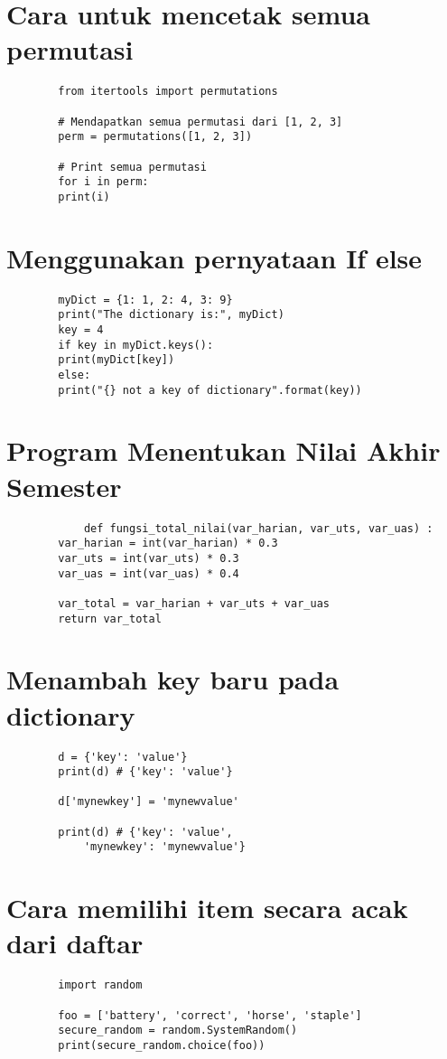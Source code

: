 \documentclass{article}
\begin{document}
	\section {Cara untuk mencetak semua permutasi}
	\begin{lstlisting}
		from itertools import permutations
		
		# Mendapatkan semua permutasi dari [1, 2, 3]
		perm = permutations([1, 2, 3])
		
		# Print semua permutasi
		for i in perm:
		print(i)
	\end{lstlisting}
	
	\section {Menggunakan pernyataan If else}
	\begin{lstlisting}
		myDict = {1: 1, 2: 4, 3: 9}
		print("The dictionary is:", myDict)
		key = 4
		if key in myDict.keys():
		print(myDict[key])
		else:
		print("{} not a key of dictionary".format(key))
	\end{lstlisting}

	\section {Program Menentukan Nilai Akhir Semester}
	\begin{lstlisting}
			def fungsi_total_nilai(var_harian, var_uts, var_uas) :
		var_harian = int(var_harian) * 0.3
		var_uts = int(var_uts) * 0.3
		var_uas = int(var_uas) * 0.4
		
		var_total = var_harian + var_uts + var_uas
		return var_total
	\end{lstlisting}
	
		\section{Menambah key baru pada dictionary}
	\begin{lstlisting}
		d = {'key': 'value'}
		print(d) # {'key': 'value'}
		
		d['mynewkey'] = 'mynewvalue'
		
		print(d) # {'key': 'value',
			'mynewkey': 'mynewvalue'}
	\end{lstlisting}
	
	\section{Cara memilihi item secara acak dari daftar}
	\begin{lstlisting}
		import random
		
		foo = ['battery', 'correct', 'horse', 'staple']
		secure_random = random.SystemRandom()
		print(secure_random.choice(foo))
	\end{lstlisting}
	
\end{document}
